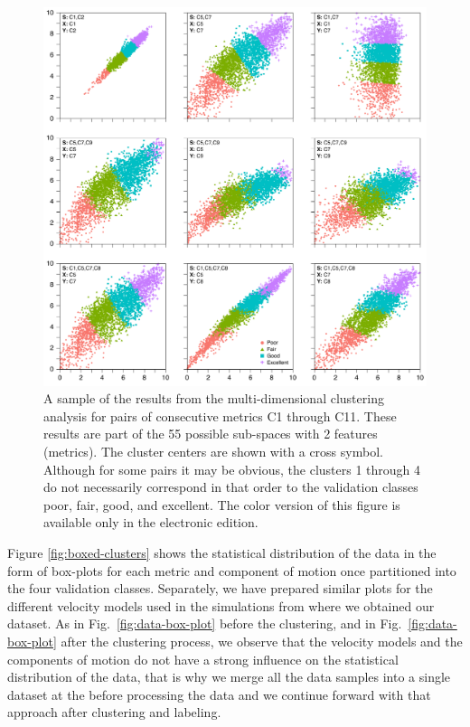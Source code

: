 \begin{figure}[ht!]
	\centering
	\includegraphics[width=\textwidth]{figures/pdf/figure-05}
	\caption{A sample of the results from the multi-dimensional clustering analysis for pairs of consecutive metrics C1 through C11. These results are part of the 55 possible sub-spaces with 2 features (metrics). The cluster centers are shown with a cross symbol. Although for some pairs it may be obvious, the clusters 1 through 4 do not necessarily correspond in that order to the validation classes poor, fair, good, and excellent. The color version of this figure is available only in the electronic edition.}
	\label{fig:clusters}
\end{figure}

Figure \ref{fig:boxed-clusters} shows the statistical distribution of the data in the form of box-plots for each metric and component of motion once partitioned into the four validation classes. Separately, we have prepared similar plots for the different velocity models used in the simulations from where we obtained our dataset. As in Fig.~\ref{fig:data-box-plot} before the clustering, and in Fig.~\ref{fig:data-box-plot} after the clustering process, we observe that the velocity models and the components of motion do not have a strong influence on the statistical distribution of the data, that is why we merge all the data samples into a single dataset at the before processing the data and we continue forward with that approach after clustering and labeling.

